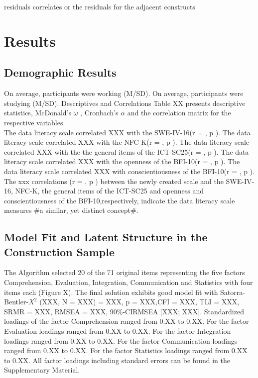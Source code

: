 \documentclass[
  12pt,
  a4paper,
  twoside]{article}
\begin{document}
residuals correlates or the residuals for the adjacent constructs

\section{Results}\label{results}

\subsection{Demographic Results}\label{demographic-results}

On average, participants were working (M/SD). On average, participants
were studying (M/SD). Descriptives and Correlations Table XX presents
descriptive statistics, McDonald's \(\omega\) , Cronbach's \(\alpha\)
and the correlation matrix for the respective variables.\\
The data literacy scale correlated XXX with the SWE-IV-16(r = , p ). The
data literacy scale correlated XXX with the NFC-K(r = , p ). The data
literacy scale correlated XXX with the the general items of the
ICT-SC25(r = , p ). The data literacy scale correlated XXX with the
openness of the BFI-10(r = , p ). The data literacy scale correlated XXX
with conscientiousness of the BFI-10(r = , p ). The xxx correlations (r
= , p ) between the newly created scale and the SWE-IV-16, NFC-K, the
general items of the ICT-SC25 and openness and conscientiousness of the
BFI-10,respectively, indicate the data literacy scale measures \#a
similar, yet distinct concept\#.

\subsection{Model Fit and Latent Structure in the Construction
Sample}\label{model-fit-and-latent-structure-in-the-construction-sample}

The Algorithm selected 20 of the 71 original items representing the five
factors Comprehension, Evaluation, Integration, Communication and
Statistics with four items each (Figure X). The final solution exhibits
good model fit with Satorra-Bentler-\(X^{2}\) (XXX, N = XXX) = XXX, p =
XXX,CFI = XXX, TLI = XXX, SRMR = XXX, RMSEA = XXX, 90\%-CIRMSEA {[}XXX;
XXX{]}. Standardized loadings of the factor Comprehension ranged from
0.XX to 0.XX. For the factor Evaluation loadings ranged from 0.XX to
0.XX. For the factor Integration loadings ranged from 0.XX to 0.XX. For
the factor Communication loadings ranged from 0.XX to 0.XX. For the
factor Statistics loadings ranged from 0.XX to 0.XX. All factor loadings
including standard errors can be found in the Supplementary Material.
\end{document}
